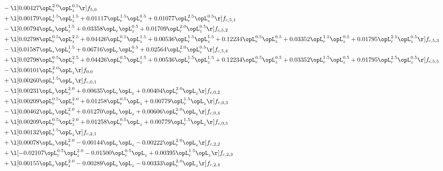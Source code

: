 \begin{alignat}{2}
& - \l[  0.00427 \opL_r^{2.0} \opL_z^{0.5}  \r] f_{5,0} \nonumber \\ 
& + \l[  0.00179 \opL_r^{1.5} \opL_z^{1.5} +  0.01117 \opL_r^{1.5} \opL_z^{0.5} +  0.01077 \opL_r^{2.5} \opL_z^{0.5}  \r] f_{c,5,1} \nonumber \\ 
& - \l[  0.00794 \opL_r \opL_z^{1.5} +  0.03358 \opL_r \opL_z^{0.5} +  0.01709 \opL_r^{2.0} \opL_z^{0.5}  \r] f_{c,5,2} \nonumber \\ 
& + \l[  0.02798 \opL_r^{0.5} \opL_z^{2.5} +  0.04426 \opL_r^{0.5} \opL_z^{1.5} +  0.00536 \opL_r^{1.5} \opL_z^{1.5} +  0.12234 \opL_r^{0.5} \opL_z^{0.5} +  0.03352 \opL_r^{1.5} \opL_z^{0.5} +  0.01795 \opL_r^{2.5} \opL_z^{0.5}  \r] f_{c,5,3} \nonumber \\ 
& - \l[  0.01587 \opL_r \opL_z^{1.5} +  0.06716 \opL_r \opL_z^{0.5} +  0.02564 \opL_r^{2.0} \opL_z^{0.5}  \r] f_{c,5,4} \nonumber \\ 
& + \l[  0.02798 \opL_r^{0.5} \opL_z^{2.5} +  0.04426 \opL_r^{0.5} \opL_z^{1.5} +  0.00536 \opL_r^{1.5} \opL_z^{1.5} +  0.12234 \opL_r^{0.5} \opL_z^{0.5} +  0.03352 \opL_r^{1.5} \opL_z^{0.5} +  0.01795 \opL_r^{2.5} \opL_z^{0.5}  \r] f_{c,5,5} \nonumber \\ 
& - \l[  0.00101 \opL_r^{2.0} \opL_z  \r] f_{0,0} \nonumber \\ 
& + \l[  0.00260 \opL_r^{1.5} \opL_z  \r] f_{c,0,1} \nonumber \\ 
& - \l[  0.00231 \opL_r \opL_z^{2.0} +  0.00635 \opL_r \opL_z +  0.00404 \opL_r^{2.0} \opL_z  \r] f_{c,0,2} \nonumber \\ 
& + \l[  0.00209 \opL_r^{0.5} \opL_z^{2.0} +  0.01258 \opL_r^{0.5} \opL_z +  0.00779 \opL_r^{1.5} \opL_z  \r] f_{c,0,3} \nonumber \\ 
& - \l[  0.00462 \opL_r \opL_z^{2.0} +  0.01270 \opL_r \opL_z +  0.00606 \opL_r^{2.0} \opL_z  \r] f_{c,0,4} \nonumber \\ 
& + \l[  0.00209 \opL_r^{0.5} \opL_z^{2.0} +  0.01258 \opL_r^{0.5} \opL_z +  0.00779 \opL_r^{1.5} \opL_z  \r] f_{c,0,5} \nonumber \\ 
& + \l[  0.00132 \opL_r^{1.5} \opL_z  \r] f_{c,2,1} \nonumber \\ 
& + \l[  0.00078 \opL_r \opL_z^{2.0}   -0.00144 \opL_r \opL_z   -0.00222 \opL_r^{2.0} \opL_z  \r] f_{c,2,2} \nonumber \\ 
& + \l[  -0.02107 \opL_r^{0.5} \opL_z^{2.0}   -0.01500 \opL_r^{0.5} \opL_z +  0.00395 \opL_r^{1.5} \opL_z  \r] f_{c,2,3} \nonumber \\ 
& + \l[  0.00155 \opL_r \opL_z^{2.0}   -0.00289 \opL_r \opL_z   -0.00333 \opL_r^{2.0} \opL_z  \r] f_{c,2,4} \nonumber \\ 

\end{alignat}
